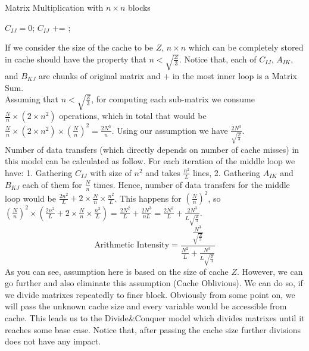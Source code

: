 \documentclass[paper=a4, fontsize=11pt]{scrartcl} %
\numberwithin{equation}{section} %
\numberwithin{figure}{section} %
\numberwithin{table}{section} %
\begin{document}
\begin{algorithm}
\caption{Matrix Multiplication with $n \times n$ blocks}
\label{Block-Alg}
\begin{algorithmic}
		\State $C_{IJ} = 0$;
			\State $C_{IJ}$ += ;
		\EndFor
	\EndFor
\EndFor
\end{algorithmic}
\end{algorithm}

If we consider the size of the cache to be $Z$, $n \times n$ which can be completely stored in cache should have the property that $n < \sqrt{\frac{Z}{3}}$. Notice that, each of $C_{IJ}$, $A_{IK}$, and $B_{KJ}$ are chunks of original matrix and $+$ in the most inner loop is a Matrix Sum.\\
Assuming that $n < \sqrt{\frac{Z}{3}}$, for computing each sub-matrix we consume $ \frac{N}{n} \times (2\times n^{2})$ operations, which in total that would be $\frac{N}{n} \times (2\times n^{2}) \times (\frac{N}{n})^{2} = \frac{2N^{3}}{n}$. Using our assumption we have $\frac{2N^{3}}{\sqrt{\frac{Z}{3}}}$.\\
Number of data transfers (which directly depends on number of cache misses) in this model can be calculated as follow.  For each iteration of the middle loop we have:  1. Gathering $C_{IJ}$ with size of $n^{2}$ and takes $\frac{n^{2}}{L}$ lines,  2. Gathering $A_{IK}$ and $B_{KJ}$ each of them for $\frac{N}{n}$ times. Hence, number of data transfers for the middle loop would be $\frac{2n^{2}}{L} + 2 \times \frac{N}{n} \times \frac{n^{2}}{L}$. This happens for $(\frac{N}{n})^{2}$, so $(\frac{N}{n})^{2} \times (\frac{2n^{2}}{L} + 2 \times \frac{N}{n} \times \frac{n^{2}}{L}) = \frac{2N^{2}}{L} + \frac{2N^{3}}{nL} = \frac{2N^{2}}{L} + \frac{2N^{3}}{L\sqrt{\frac{Z}{3}}}$.
\begin{equation*}
\text{Arithmetic Intensity} = \frac{\frac{N^{3}}{\sqrt{\frac{Z}{3}}}}{\frac{N^{2}}{L} + \frac{N^{3}}{L\sqrt{\frac{Z}{3}}}}
\end{equation*}
As you can see, assumption here is based on the size of cache $Z$. However, we can go further and also eliminate this assumption (Cache Oblivious). We can do so, if we divide matrixes repeatedly to finer block. Obviously from some point on, we will pass the unknown cache size and every variable would be accessible from cache. This leads us to the Divide\&Conquer model which divides matrixes until it reaches some base case. Notice that, after passing the cache size further divisions does not have any impact.\\
\end{document}
